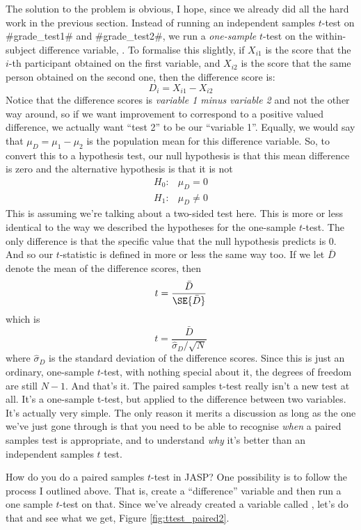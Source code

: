 The solution to the problem is obvious, I hope, since we already did all the hard work in the previous section. Instead of running an independent samples $t$-test on \rtextverb#grade_test1# and \rtextverb#grade_test2#, we run a {\it one-sample} $t$-test on the within-subject difference variable, . To formalise this slightly, if $X_{i1}$ is the score that the $i$-th participant obtained on the first variable, and $X_{i2}$ is the score that the same person obtained on the second one, then the difference score is:
$$
D_{i} = X_{i1} - X_{i2} 
$$
Notice that the difference scores is {\it variable 1 minus variable 2} and not the other way around, so if we want improvement to correspond to a positive valued difference, we actually want ``test 2'' to be our ``variable 1''. Equally, we would say that $\mu_D = \mu_1 - \mu_2$ is the population mean for this difference variable. So, to convert this to a hypothesis test, our null hypothesis is that this mean difference is zero and the alternative hypothesis is that it is not
$$
\begin{array}{ll}
H_0: & \mu_D = 0  \\
H_1: & \mu_D \neq 0
\end{array}
$$
This is assuming we're talking about a two-sided test here. This is more or less identical to the way we described the hypotheses for the one-sample $t$-test. The only difference is that the specific value that the null hypothesis predicts is 0. And so our $t$-statistic is defined in more or less the same way too. If we let $\bar{D}$ denote the mean of the difference scores, then 
$$
t = \frac{\bar{D}}{\SE{\bar{D}}}
$$
which is 
$$
t = \frac{\bar{D}}{\hat\sigma_D / \sqrt{N}}
$$
where $\hat\sigma_D$ is the standard deviation of the difference scores. Since this is just an ordinary, one-sample $t$-test, with nothing special about it, the degrees of freedom are still $N-1$. And that’s it. The paired samples t-test really isn’t a new test at all. It’s a one-sample t-test, but applied to the difference between two variables. It's actually very simple. The only reason it merits a discussion as long as the one we've just gone through is that you need to be able to recognise {\it when} a paired samples test is appropriate, and to understand {\it why} it's better than an independent samples $t$ test. 


How do you do a paired samples $t$-test in JASP? One possibility is to follow the process I outlined above. That is, create a ``difference'' variable and then run a one sample $t$-test on that. Since we've already created a variable called , let's do that and see what we get, Figure \ref{fig:ttest_paired2}.

